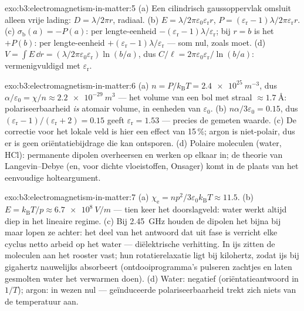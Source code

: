 \begin{solution}{exo:b3:electromagnetism-in-matter:5}
(a) Een cilindrisch gaussoppervlak omsluit alleen vrije lading:
$D = \lambda/2\pi r$, radiaal. (b) $E =
\lambda/2\pi\varepsilon_0\varepsilon_{\text{r}}r$, $P =
(\varepsilon_{\text{r}}-1)\lambda/2\pi\varepsilon_{\text{r}}r$.
(c) $\sigma_{\text{b}}(a) = -P(a)$: per lengte-eenheid
$-(\varepsilon_{\text{r}}-1)\lambda/\varepsilon_{\text{r}}$;
bij $r = b$ is het $+P(b)$: per lengte-eenheid
$+(\varepsilon_{\text{r}}-1)\lambda/\varepsilon_{\text{r}}$ ---
som nul, zoals  moet. (d) $V = \int E\,\dd r =
(\lambda/2\pi\varepsilon_0\varepsilon_{\text{r}})\ln(b/a)$, dus
$C/\ell = 2\pi\varepsilon_0\varepsilon_{\text{r}}/\ln(b/a)$:
vermenigvuldigd met $\varepsilon_{\text{r}}$.
\end{solution}

\begin{solution}{exo:b3:electromagnetism-in-matter:6}
(a) $n = P/k_{\text{B}}T = \qty{2.4e25}{m^{-3}}$, dus
$\alpha/\varepsilon_0 = \chi/n \approx \qty{2.2e-29}{m^3}$ ---
het volume van een bol met straal $\approx\qty{1.7}{\angstrom}$:
polariseerbaarheid \emph{is} atomair volume, in eenheden van $\varepsilon_0$.
(b) $n\alpha/3\varepsilon_0 = 0.15$, dus $(\varepsilon_{\text{r}} -
1)/(\varepsilon_{\text{r}} + 2) = 0.15$ geeft
$\varepsilon_{\text{r}} = 1.53$ --- precies de gemeten waarde.
(c) De correctie voor het lokale veld is hier een effect van 15\,\%; argon is
niet-polair, dus er is geen oriëntatiebijdrage die kan ontsporen. (d)
Polaire moleculen (water, HCl): permanente dipolen overheersen en
werken op elkaar in; de theorie van Langevin--Debye (en, voor dichte vloeistoffen, Onsager)
komt in de plaats van het eenvoudige holteargument.
\end{solution}

\begin{solution}{exo:b3:electromagnetism-in-matter:7}
(a) $\chi_{\text{e}} = np^2/3\varepsilon_0k_{\text{B}}T \approx
11.5$. (b) $E = k_{\text{B}}T/p \approx \qty{6.7e8}{V/m}$ ---
tien keer het doorslagveld: water werkt altijd diep in het
lineaire regime. (c) Bij \qty{2.45}{GHz} houden de dipolen het bijna bij
maar lopen ze achter: het deel van het antwoord dat uit fase is verricht elke
cyclus netto arbeid op het water --- diëlektrische verhitting. In ijs zitten de moleculen
aan het rooster vast; hun rotatierelaxatie ligt bij
kilohertz, zodat ijs bij gigahertz nauwelijks absorbeert (ontdooiprogramma's
pulseren zachtjes en laten gesmolten water het verwarmen doen). (d) Water:
negatief (oriëntatieantwoord in $1/T$); argon: in wezen nul ---
geïnduceerde polariseerbaarheid trekt zich niets van de temperatuur aan.
\end{solution}

